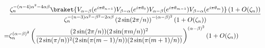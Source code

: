 \documentclass[11pt]{article}
\newcommand{\mO}{\mathcal{O}}
\newcommand{\nn}{\nonumber}
\newcommand{\lb}{\left(}
\newcommand{\rb}{\right)}
\begin{document}
\begin{align}
    &\frac{\zeta_n^{-(n-4)\alpha^2 -4\alpha\beta} \braket{V_{\alpha - \beta}(e^{i\pi \theta_{n-1}})V_{\beta - \alpha}(e^{i\pi\theta_0})V_{\alpha -\beta}(e^{i\pi\theta_{m-1}})V_{\beta - \alpha}(e^{i\pi \theta_{m}})}\lb 1+ O(\zeta_n)\rb}{\zeta_n^{-(n-3)\alpha^2 - \beta^2-2\alpha\beta}\lb2\sin(2\pi/n)\rb^{-(\alpha - \beta)^2} \lb 1+ O(\zeta_n)\rb}  \\
    =& \zeta_n^{(\alpha-\beta)^2} \lb\frac{(2\sin(2\pi/n))(2\sin(\pi m /n))^2}{(2\sin(\pi/n))^2(2\sin(\pi(m-1)/n))(2\sin(\pi (m+1)/n))}\rb^{(\alpha - \beta)^2}\lb 1+ O(\zeta_n)\rb 
\end{align}
\end{document}
